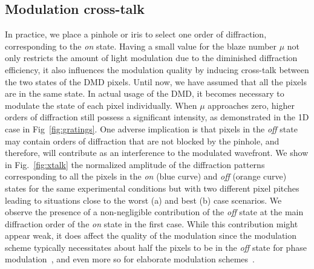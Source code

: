 \documentclass[12pt]{iopart}
\begin{document}
\subsection{Modulation cross-talk}

In practice, we place a pinhole or iris to select
one order of diffraction,
corresponding to the {\em on} state.
Having a small value for the blaze number $\mu$
not only restricts the amount of light modulation
due to the diminished diffraction efficiency,
it also influences the modulation quality by inducing cross-talk
between the two states of the DMD pixels.
Until now, we have assumed that all the pixels are in the same state.
In actual usage of the DMD,
it becomes necessary to modulate the state of each pixel individually.
When $\mu$ approaches zero, higher orders of diffraction
still possess a significant intensity,
as demonstrated in the 1D case in Fig~\ref{fig:gratings}.
One adverse implication is that pixels in the {\em off} state
may contain orders of diffraction that are not blocked by the pinhole,
and therefore, will contribute as an interference to the modulated wavefront.
We show in Fig.~\ref{fig:xtalk} the normalized amplitude of the diffraction patterns
corresponding to all the pixels in the {\em on} (blue curve) and {\em off} (orange curve) states
for the same experimental conditions but with two different pixel pitches
leading to situations close to the worst (a) and best (b) case scenarios.
We observe the presence of a non-negligible contribution of the {\em off} state
at the main diffraction order of the {\em on} state in the first case.
While this contribution might appear weak,
it does affect the quality of the modulation
since the modulation scheme typically necessitates about half the pixels
to be in the {\em off} state for phase modulation~\cite{lee1979binary},
and even more so for elaborate modulation schemes~\cite{goorden2014superpixel,Gutierrez2024DMD}.\\
\end{document}

